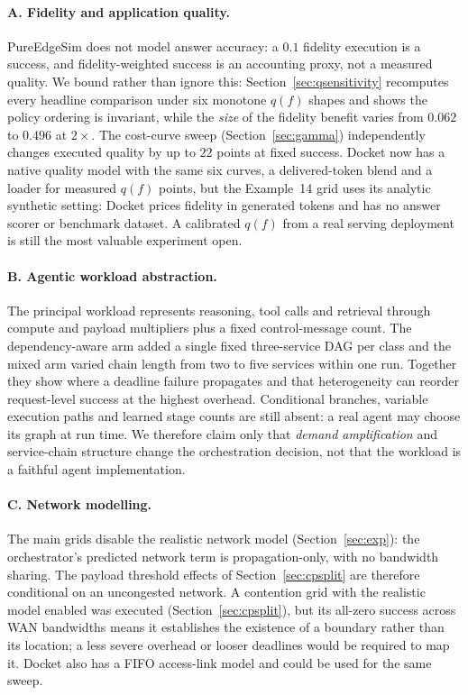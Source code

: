 \documentclass[journal,10pt]{IEEEtran}
\begin{document}
\paragraph{A. Fidelity and application quality.}
PureEdgeSim does not model answer accuracy: a $0.1$ fidelity execution is a
success, and fidelity-weighted success is an accounting proxy, not a measured
quality. We bound rather than ignore this: Section~\ref{sec:qsensitivity}
recomputes every headline comparison under six monotone $q(f)$ shapes and shows
the policy ordering is invariant, while the \emph{size} of the fidelity benefit
varies from $0.062$ to $0.496$ at $2\times$. The cost-curve sweep
(Section~\ref{sec:gamma}) independently changes executed quality by up to $22$
points at fixed success. Docket now has a native quality model with the same six
curves, a delivered-token blend and a loader for measured $q(f)$ points, but the
Example~14 grid uses its analytic synthetic setting: Docket prices fidelity in
generated tokens and has no answer scorer or benchmark dataset. A calibrated
$q(f)$ from a real serving deployment is still the most valuable experiment open.

\paragraph{B. Agentic workload abstraction.}
The principal workload represents reasoning, tool calls and retrieval through
compute and payload multipliers plus a fixed control-message count. The
dependency-aware arm added a single fixed three-service DAG per class and the
mixed arm varied chain length from two to five services within one run. Together
they show where a deadline failure propagates and that heterogeneity can reorder
request-level success at the highest overhead. Conditional branches, variable
execution paths and learned stage counts are still absent: a real agent may
choose its graph at run time. We therefore claim only that \emph{demand
amplification} and service-chain structure change the orchestration decision,
not that the workload is a faithful agent implementation.

\paragraph{C. Network modelling.}
The main grids disable the realistic network model (Section~\ref{sec:exp}): the
orchestrator's predicted network term is propagation-only, with no bandwidth
sharing. The payload threshold effects of Section~\ref{sec:cpsplit} are therefore
conditional on an uncongested network. A contention grid with the realistic model
enabled was executed (Section~\ref{sec:cpsplit}), but its all-zero success across
WAN bandwidths means it establishes the existence of a boundary rather than its
location; a less severe overhead or looser deadlines would be required to map it.
Docket also has a FIFO access-link model and could be used for the same sweep.
\end{document}

